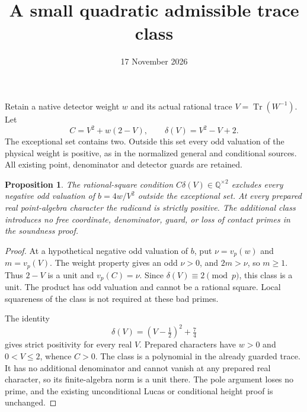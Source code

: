 \documentclass[11pt,a4paper]{article}
\title{A small quadratic admissible trace class}
\author{}\date{17 November 2026}
\newtheorem{proposition}{Proposition}
\newcommand{\Q}{\mathbb Q}
\begin{document}
\maketitle

Retain a native detector weight $w$ and its actual rational trace
$V=\operatorname{Tr}(W^{-1})$. Let
\[
 C=V^2+w(2-V),\qquad \delta(V)=V^2-V+2.
\]
The exceptional set contains two. Outside this set every odd valuation
of the physical weight is positive, as in the normalized general and
conditional sources. All existing point, denominator and detector
guards are retained.

\begin{proposition}
The rational-square condition $C\delta(V)\in\Q^{\times2}$ excludes
every negative odd valuation of $b=4w/V^2$ outside the exceptional set.
At every prepared real point-algebra character the radicand is strictly
positive. The additional class introduces no free coordinate,
denominator, guard, or loss of contact primes in the soundness proof.
\end{proposition}
\begin{proof}
At a hypothetical negative odd valuation of $b$, put
$\nu=v_p(w)$ and $m=v_p(V)$. The weight property gives an odd
$\nu>0$, and $2m>\nu$, so $m\ge1$. Thus $2-V$ is a unit and
$v_p(C)=\nu$. Since $\delta(V)\equiv2\pmod p$, this class is a
unit. The product has odd valuation and cannot be a rational square.
Local squareness of the class is not required at these bad primes.

The identity
\[
 \delta(V)=(V-\tfrac12)^2+\tfrac74
\]
gives strict positivity for every real $V$. Prepared characters have
$w>0$ and $0<V\le2$, whence $C>0$. The class is a polynomial in
the already guarded trace. It has no additional denominator and cannot
vanish at any prepared real character, so its finite-algebra norm is
a unit there. The pole argument loses no prime, and the existing
unconditional Lucas or conditional height proof is unchanged.
\end{proof}
\end{document}
